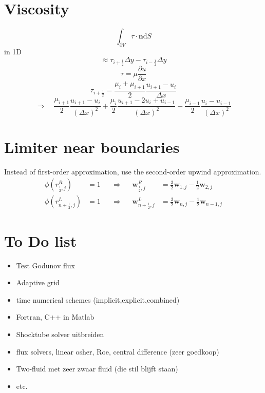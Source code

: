 \documentclass{article}
\newcommand{\ud}{\mathrm{d}}
\begin{document}
\section{Viscosity}
\begin{displaymath}
\int_{\partial V}\tau\cdot\mathbf{n}\ud S
\end{displaymath}
in 1D
\begin{displaymath}
\approx \tau_{i+\frac{1}{2}}\Delta y - \tau_{i-\frac{1}{2}}\Delta y
\end{displaymath}
\begin{displaymath}
\tau = \mu\frac{\partial u}{\partial x}
\end{displaymath}
\begin{displaymath}
\tau_{i+\frac{1}{2}}=\frac{\mu_i+\mu_{i+1}}{2}\frac{u_{i+1}-u_i}{\Delta x}
\end{displaymath}
\begin{displaymath}
\Rightarrow \quad \frac{\mu_{i+1}}{2}\frac{u_{i+1}-u_i}{(\Delta x)^2}+\frac{\mu_i}{2}\frac{u_{i+1}-2u_i+u_{i-1}}{(\Delta x)^2}-\frac{\mu_{i-1}}{2}\frac{u_i-u_{i-1}}{(\Delta x)^2}	
\end{displaymath}

\section{Limiter near boundaries}
Instead of first-order approximation, use the second-order upwind approximation.
\begin{align*}
\phi\left(r^R_{\frac{1}{2},j}\right)&=1 \quad & \Rightarrow& & \mathbf{w}^R_{\frac{1}{2},j}&=\frac{3}{2}\mathbf{w}_{1,j}-\frac{1}{2}\mathbf{w}_{2,j} \\
\phi\left(r^L_{n+\frac{1}{2},j}\right)&=1 \quad & \Rightarrow& & \mathbf{w}^L_{n+\frac{1}{2},j}&=\frac{3}{2}\mathbf{w}_{n,j}-\frac{1}{2}\mathbf{w}_{n-1,j}
\end{align*}




\section{To Do list}

\begin{itemize}
\item Test Godunov flux
\item Adaptive grid
\item time numerical schemes (implicit,explicit,combined)
\item Fortran, C++ in Matlab
\item Shocktube solver uitbreiden
\item flux solvers, linear osher, Roe, central difference (zeer goedkoop)
\item Two-fluid met zeer zwaar fluid (die stil blijft staan)
\item etc.
\end{itemize}
\end{document}
